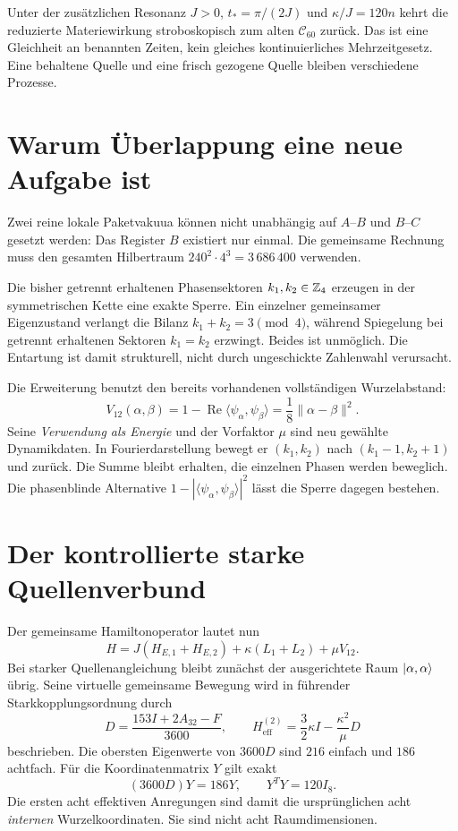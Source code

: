 Unter der zusätzlichen Resonanz $J>0$, $t_*=\pi/(2J)$ und $\kappa/J=120n$ kehrt die reduzierte Materiewirkung stroboskopisch zum alten $\mathcal C_{60}$ zurück. Das ist eine Gleichheit an benannten Zeiten, kein gleiches kontinuierliches Mehrzeitgesetz. Eine behaltene Quelle und eine frisch gezogene Quelle bleiben verschiedene Prozesse.

\section{Warum Überlappung eine neue Aufgabe ist}
Zwei reine lokale Paketvakuua können nicht unabhängig auf $A$--$B$ und $B$--$C$ gesetzt werden: Das Register $B$ existiert nur einmal. Die gemeinsame Rechnung muss den gesamten Hilbertraum $240^2\cdot4^3=3\,686\,400$ verwenden.

Die bisher getrennt erhaltenen Phasensektoren $k_1,k_2\in\mathbb Z_4$ erzeugen in der symmetrischen Kette eine exakte Sperre. Ein einzelner gemeinsamer Eigenzustand verlangt die Bilanz $k_1+k_2=3\pmod4$, während Spiegelung bei getrennt erhaltenen Sektoren $k_1=k_2$ erzwingt. Beides ist unmöglich. Die Entartung ist damit strukturell, nicht durch ungeschickte Zahlenwahl verursacht. 

Die Erweiterung benutzt den bereits vorhandenen vollständigen Wurzelabstand:
\[
 V_{12}(\alpha,\beta)=1-\operatorname{Re}\langle\psi_\alpha,\psi_\beta\rangle
 =\frac18\|\alpha-\beta\|^2.
\]
Seine \emph{Verwendung als Energie} und der Vorfaktor $\mu$ sind neu gewählte Dynamikdaten. In Fourierdarstellung bewegt er $(k_1,k_2)$ nach $(k_1-1,k_2+1)$ und zurück. Die Summe bleibt erhalten, die einzelnen Phasen werden beweglich. Die phasenblinde Alternative $1-|\langle\psi_\alpha,\psi_\beta\rangle|^2$ lässt die Sperre dagegen bestehen. 

\section{Der kontrollierte starke Quellenverbund}
Der gemeinsame Hamiltonoperator lautet nun
\[
 H=J(H_{E,1}+H_{E,2})+\kappa(L_1+L_2)+\mu V_{12}.
\]
Bei starker Quellenangleichung bleibt zunächst der ausgerichtete Raum $\lvert \alpha,\alpha\rangle$ übrig. Seine virtuelle gemeinsame Bewegung wird in führender Starkkopplungsordnung durch
\[
 D=\frac{153I+2A_{32}-F}{3600},\qquad
 H_{\mathrm{eff}}^{(2)}=\frac32\kappa I-\frac{\kappa^2}{\mu}D
\]
beschrieben. Die obersten Eigenwerte von $3600D$ sind $216$ einfach und $186$ achtfach. Für die Koordinatenmatrix $Y$ gilt exakt
\[
 (3600D)Y=186Y,\qquad Y^TY=120I_8.
\]
Die ersten acht effektiven Anregungen sind damit die ursprünglichen acht \emph{internen} Wurzelkoordinaten. Sie sind nicht acht Raumdimensionen. 

